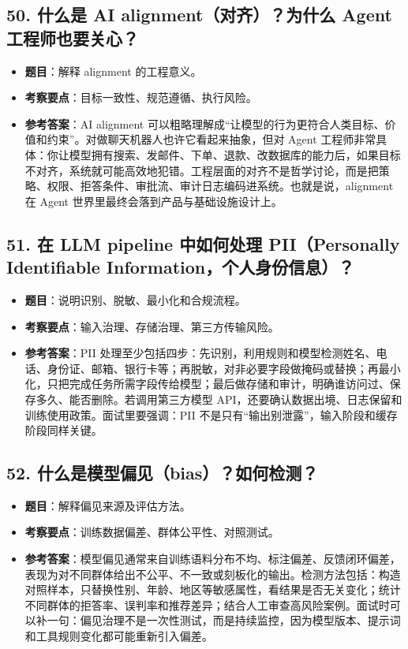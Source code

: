 \subsection{50. 什么是 AI alignment（对齐）？为什么 Agent 工程师也要关心？}
\begin{itemize}[leftmargin=2em]
\item \textbf{题目}：解释 alignment 的工程意义。
\item \textbf{考察要点}：目标一致性、规范遵循、执行风险。
\item \textbf{参考答案}：AI alignment 可以粗略理解成``让模型的行为更符合人类目标、价值和约束''。对做聊天机器人也许它看起来抽象，但对 Agent 工程师非常具体：你让模型拥有搜索、发邮件、下单、退款、改数据库的能力后，如果目标不对齐，系统就可能高效地犯错。工程层面的对齐不是哲学讨论，而是把策略、权限、拒答条件、审批流、审计日志编码进系统。也就是说，alignment 在 Agent 世界里最终会落到产品与基础设施设计上。
\end{itemize}

\subsection{51. 在 LLM pipeline 中如何处理 PII（Personally Identifiable Information，个人身份信息）？}
\begin{itemize}[leftmargin=2em]
\item \textbf{题目}：说明识别、脱敏、最小化和合规流程。
\item \textbf{考察要点}：输入治理、存储治理、第三方传输风险。
\item \textbf{参考答案}：PII 处理至少包括四步：先识别，利用规则和模型检测姓名、电话、身份证、邮箱、银行卡等；再脱敏，对非必要字段做掩码或替换；再最小化，只把完成任务所需字段传给模型；最后做存储和审计，明确谁访问过、保存多久、能否删除。若调用第三方模型 API，还要确认数据出境、日志保留和训练使用政策。面试里要强调：PII 不是只有``输出别泄露''，输入阶段和缓存阶段同样关键。
\end{itemize}

\subsection{52. 什么是模型偏见（bias）？如何检测？}
\begin{itemize}[leftmargin=2em]
\item \textbf{题目}：解释偏见来源及评估方法。
\item \textbf{考察要点}：训练数据偏差、群体公平性、对照测试。
\item \textbf{参考答案}：模型偏见通常来自训练语料分布不均、标注偏差、反馈闭环偏差，表现为对不同群体给出不公平、不一致或刻板化的输出。检测方法包括：构造对照样本，只替换性别、年龄、地区等敏感属性，看结果是否无关变化；统计不同群体的拒答率、误判率和推荐差异；结合人工审查高风险案例。面试时可以补一句：偏见治理不是一次性测试，而是持续监控，因为模型版本、提示词和工具规则变化都可能重新引入偏差。
\end{itemize}

